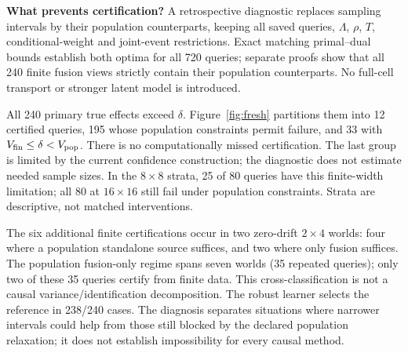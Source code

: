 \textbf{What prevents certification?} A retrospective diagnostic replaces sampling intervals by their population counterparts, keeping all saved queries, $\Lambda$, $\rho$, $T$, conditional-weight and joint-event restrictions. Exact matching primal--dual bounds establish both optima for all 720 queries; separate proofs show that all 240 finite fusion views strictly contain their population counterparts. No full-cell transport or stronger latent model is introduced.

All 240 primary true effects exceed $\delta$. Figure~\ref{fig:fresh} partitions them into 12 certified queries, 195 whose population constraints permit failure, and 33 with $V_{\rm fin}\le\delta<V_{\rm pop}$. There is no computationally missed certification. The last group is limited by the current confidence construction; the diagnostic does not estimate needed sample sizes. In the $8\times8$ strata, 25 of 80 queries have this finite-width limitation; all 80 at $16\times16$ still fail under population constraints. Strata are descriptive, not matched interventions.

The six additional finite certifications occur in two zero-drift $2\times4$ worlds: four where a population standalone source suffices, and two where only fusion suffices. The population fusion-only regime spans seven worlds (35 repeated queries); only two of these 35 queries certify from finite data. This cross-classification is not a causal variance/identification decomposition. The robust learner selects the reference in 238/240 cases. The diagnosis separates situations where narrower intervals could help from those still blocked by the declared population relaxation; it does not establish impossibility for every causal method.
